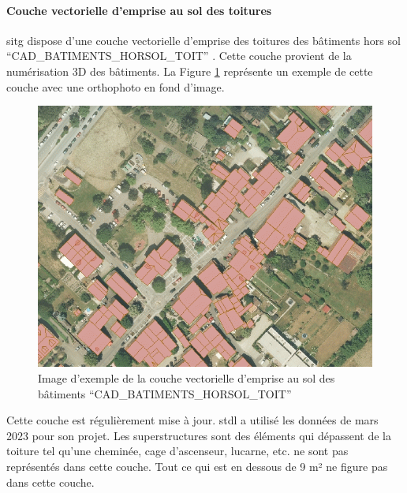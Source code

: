\paragraph{Couche vectorielle d'emprise au sol des toitures}
\par{\acrshort{sitg} dispose d'une couche vectorielle d'emprise des toitures des bâtiments hors sol ``CAD\_BATIMENTS\_HORSOL\_TOIT'' \cite{sitg_toits_nodate}. Cette couche provient de la numérisation 3D des bâtiments. La Figure \ref{fig:stdl_01_couche_vectorielle} représente un exemple de cette couche avec une orthophoto en fond d'image.}
\begin{figure}[H]
    \centering
    \includegraphics[width=1\linewidth]{02-main//figures/ch2/stdl_01_couche_vectorielle.png}
    \caption{Image d’exemple de la couche vectorielle d’emprise au sol des bâtiments ``CAD\_BATIMENTS\_HORSOL\_TOIT'' \cite{sitg_toits_nodate}}
    \label{fig:stdl_01_couche_vectorielle}
\end{figure}
\par{Cette couche est régulièrement mise à jour. \acrshort{stdl} a utilisé les données de mars 2023 pour son projet. Les superstructures sont des éléments qui dépassent de la toiture tel qu'une cheminée, cage d'ascenseur, lucarne, etc. ne sont pas représentés dans cette couche. Tout ce qui est en dessous de 9 m² ne figure pas dans cette couche.}

